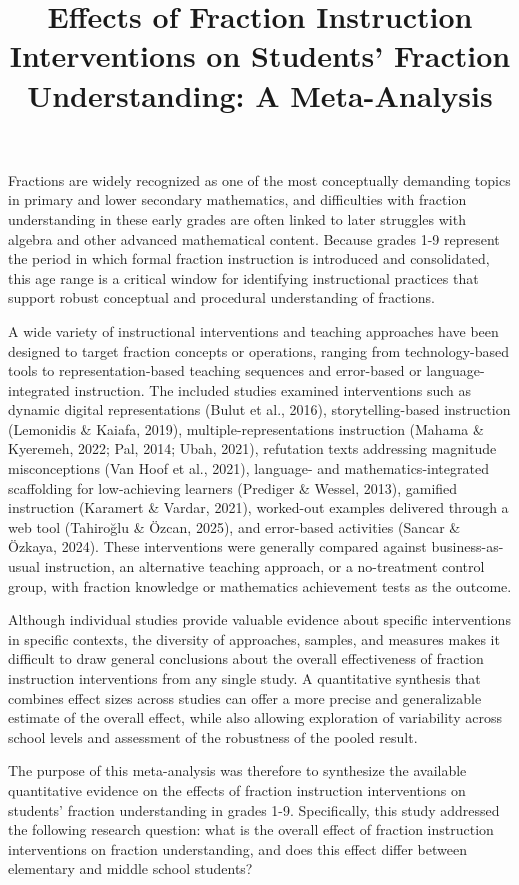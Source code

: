 \documentclass[man,a4paper,12pt,floatsintext,nolmodern,notab]{apa7}
\title{Effects of Fraction Instruction Interventions on Students' Fraction Understanding: A Meta-Analysis}
\begin{document}
\maketitle
Fractions are widely recognized as one of the most conceptually demanding topics in primary and lower secondary mathematics, and difficulties with fraction understanding in these early grades are often linked to later struggles with algebra and other advanced mathematical content. Because grades 1-9 represent the period in which formal fraction instruction is introduced and consolidated, this age range is a critical window for identifying instructional practices that support robust conceptual and procedural understanding of fractions.

A wide variety of instructional interventions and teaching approaches have been designed to target fraction concepts or operations, ranging from technology-based tools to representation-based teaching sequences and error-based or language-integrated instruction. The included studies examined interventions such as dynamic digital representations (Bulut et al., 2016), storytelling-based instruction (Lemonidis \& Kaiafa, 2019), multiple-representations instruction (Mahama \& Kyeremeh, 2022; Pal, 2014; Ubah, 2021), refutation texts addressing magnitude misconceptions (Van Hoof et al., 2021), language- and mathematics-integrated scaffolding for low-achieving learners (Prediger \& Wessel, 2013), gamified instruction (Karamert \& Vardar, 2021), worked-out examples delivered through a web tool (Tahiroğlu \& Özcan, 2025), and error-based activities (Sancar \& Özkaya, 2024). These interventions were generally compared against business-as-usual instruction, an alternative teaching approach, or a no-treatment control group, with fraction knowledge or mathematics achievement tests as the outcome.

Although individual studies provide valuable evidence about specific interventions in specific contexts, the diversity of approaches, samples, and measures makes it difficult to draw general conclusions about the overall effectiveness of fraction instruction interventions from any single study. A quantitative synthesis that combines effect sizes across studies can offer a more precise and generalizable estimate of the overall effect, while also allowing exploration of variability across school levels and assessment of the robustness of the pooled result.

The purpose of this meta-analysis was therefore to synthesize the available quantitative evidence on the effects of fraction instruction interventions on students' fraction understanding in grades 1-9. Specifically, this study addressed the following research question: what is the overall effect of fraction instruction interventions on fraction understanding, and does this effect differ between elementary and middle school students?
\end{document}
